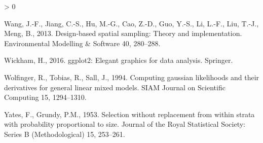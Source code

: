 \documentclass[]{elsarticle} %
\newlength{\cslhangindent}
\newenvironment{CSLReferences}[2] %
 {%
  \setlength{\parindent}{0pt}
  \ifodd #1 \everypar{\setlength{\hangindent}{\cslhangindent}}\ignorespaces\fi
  \ifnum #2 > 0
  \setlength{\parskip}{#2\baselineskip}
  \fi
 }%
 {}
\begin{document}
\begin{CSLReferences}{1}{0}
\leavevmode\hypertarget{ref-wang2013design}{}%
Wang, J.-F., Jiang, C.-S., Hu, M.-G., Cao, Z.-D., Guo, Y.-S., Li, L.-F.,
Liu, T.-J., Meng, B., 2013. Design-based spatial sampling: Theory and
implementation. Environmental Modelling \& Software 40, 280--288.

\leavevmode\hypertarget{ref-wickham2016ggplot2}{}%
Wickham, H., 2016. ggplot2: Elegant graphics for data analysis.
Springer.

\leavevmode\hypertarget{ref-wolfinger1994computing}{}%
Wolfinger, R., Tobias, R., Sall, J., 1994. Computing gaussian
likelihoods and their derivatives for general linear mixed models. SIAM
Journal on Scientific Computing 15, 1294--1310.

\leavevmode\hypertarget{ref-yates1953selection}{}%
Yates, F., Grundy, P.M., 1953. Selection without replacement from within
strata with probability proportional to size. Journal of the Royal
Statistical Society: Series B (Methodological) 15, 253--261.

\end{CSLReferences}
\end{document}
